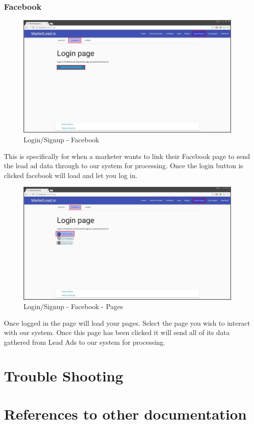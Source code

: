 \documentclass{article}
\begin{document}
			\subsubsection{Facebook}
				\begin{figure}[H]
					\includegraphics[width=\textwidth]{images/login_signup_facebook.jpg}
					\caption{Login/Signup - Facebook}
				\end{figure}
				This is specifically for when a marketer wants to link their Facebook page to send the lead ad data through to our system for processing.
				Once the login button is clicked facebook will load and let you log in.

				\begin{figure}[H]
					\includegraphics[width=\textwidth]{images/login_signup_facebook_pages.jpg}
					\caption{Login/Signup - Facebook - Pages}
				\end{figure}
				Once logged in the page will load your pages. Select the page you wish to interact with our system.
				Once this page has been clicked it will send all of its data gathered from Lead Ads to our system for processing.

	\section{Trouble Shooting}

	\section{References to other documentation}
\end{document}
